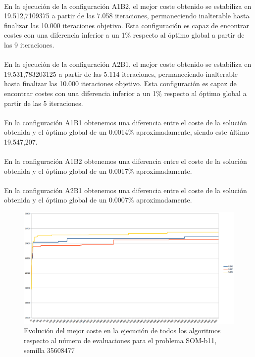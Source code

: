 	\paragraph{}En la ejecución de la configuración A1B2, el mejor coste obtenido se estabiliza en 19.512,7109375 a partir de las 7.058 iteraciones, permaneciendo inalterable hasta finalizar las 10.000 iteraciones objetivo. Esta configuración es capaz de encontrar costes con una diferencia inferior a un 1\% respecto al óptimo global a partir de las 9 iteraciones.
	
	\paragraph{}En la ejecución de la configuración A2B1, el mejor coste obtenido se estabiliza en 19.531,783203125 a partir de las 5.114 iteraciones, permaneciendo inalterable hasta finalizar las 10.000 iteraciones objetivo. Esta configuración es capaz de encontrar costes con una diferencia inferior a un 1\% respecto al óptimo global a partir de las 5 iteraciones.
	
	\paragraph{}En la configuración A1B1 obtenemos una diferencia entre el coste de la solución obtenida y el óptimo global de un 0.0014\% aproximadamente, siendo este último 19.547,207.
	
	\paragraph{}En la configuración A1B2 obtenemos una diferencia entre el coste de la solución obtenida y el óptimo global de un 0.0017\% aproximadamente.
	
	\paragraph{}En la configuración A2B1 obtenemos una diferencia entre el coste de la solución obtenida y el óptimo global de un 0.0007\% aproximadamente.

	\begin{figure}[H]
		\centering
		\includegraphics[scale=0.3]{img/SOM1conver.png}
		\caption{Evolución del mejor coste en la ejecución de todos los algoritmos respecto al número de evaluaciones para el problema SOM-b11, semilla 35608477}
		\label{SOM-b_11_historico}
	\end{figure}

